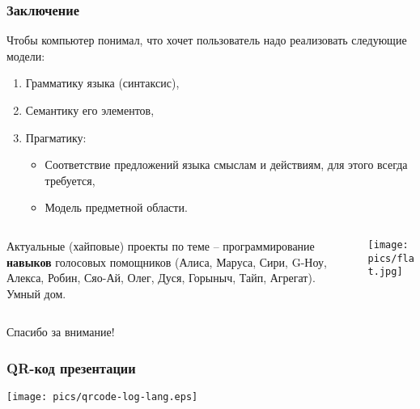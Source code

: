 \documentclass[10pt]{beamer}
\begin{document}
\begin{frame}
  \frametitle{Заключение}
  Чтобы компьютер понимал, что хочет пользователь надо реализовать следующие модели:
  \begin{enumerate}
  \item Грамматику языка (синтаксис),
  \item Семантику его элементов,
  \item Прагматику:
    \begin{itemize}
    \item Соответствие предложений языка смыслам и действиям, для этого всегда требуется,
    \item Модель предметной области.
    \end{itemize}
  \end{enumerate}
  \begin{columns}
    \begin{column}{0.5\linewidth}
      Актуальные (хайповые) проекты по теме -- программирование \textbf{навыков} голосовых помощников (Алиса, Маруса, Сири, G-Ноу, Алекса, Робин, Сяо-Ай, Олег, Дуся, Горыныч, Тайп, Агрегат).\\[1em]
      Умный дом.
    \end{column}
    \begin{column}{0.6\linewidth}
      \texttt{[image: pics/flat.jpg]}
    \end{column}
  \end{columns}
\end{frame}

\begin{frame}
  \vfill
  \begin{center}
    {\Huge Спасибо за внимание!}
  \end{center}
  \vfill
\end{frame}
\begin{frame}
  \frametitle{QR-код презентации}
  \centering
  \texttt{[image: pics/qrcode-log-lang.eps]}
\end{frame}
\end{document}
